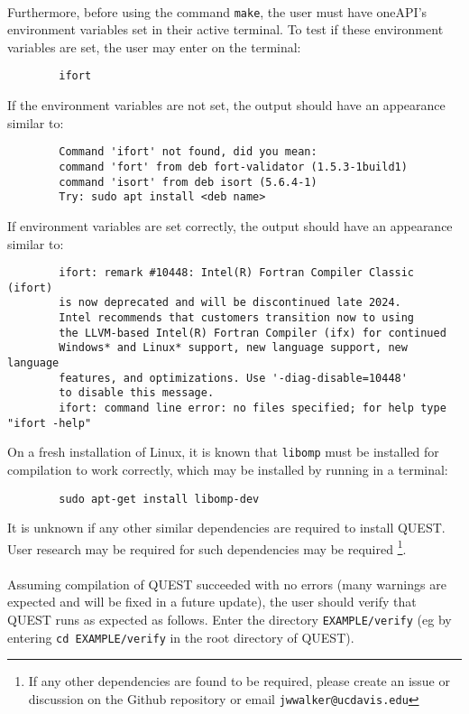 \documentclass[12pt]{article}
\begin{document}
        \\
        Furthermore, before using the command \texttt{make}, the user must have oneAPI's environment variables set in their active terminal.
        To test if these environment variables are set, the user may enter on the terminal:
        \begin{verbatim}
        ifort
        \end{verbatim}
        If the environment variables are not set, the output should have an appearance similar to:
        \begin{verbatim}
        Command 'ifort' not found, did you mean:
        command 'fort' from deb fort-validator (1.5.3-1build1)
        command 'isort' from deb isort (5.6.4-1)
        Try: sudo apt install <deb name>
        \end{verbatim}
        If environment variables are set correctly, the output should have an appearance similar to:
        \begin{verbatim}
        ifort: remark #10448: Intel(R) Fortran Compiler Classic (ifort)
        is now deprecated and will be discontinued late 2024.
        Intel recommends that customers transition now to using
        the LLVM-based Intel(R) Fortran Compiler (ifx) for continued
        Windows* and Linux* support, new language support, new language
        features, and optimizations. Use '-diag-disable=10448'
        to disable this message.
        ifort: command line error: no files specified; for help type "ifort -help"
        \end{verbatim}
        \noindent On a fresh installation of Linux, it is known that \texttt{libomp} must be installed for compilation to work correctly, which may be installed by running in a terminal:
        \begin{verbatim}
        sudo apt-get install libomp-dev
        \end{verbatim}
        It is unknown if any other similar dependencies are required to install QUEST.
        User research may be required for such dependencies may be required \footnote{If any other dependencies are found to be required, please create an issue or discussion on the Github repository or email \texttt{jwwalker@ucdavis.edu}}. \\
        \\
        \noindent Assuming compilation of QUEST succeeded with no errors (many warnings are expected and will be fixed in a future update), the user should verify that QUEST runs as expected as follows.
        Enter the directory \texttt{EXAMPLE/verify} (eg by entering \texttt{cd EXAMPLE/verify} in the root directory of QUEST).
\end{document}

